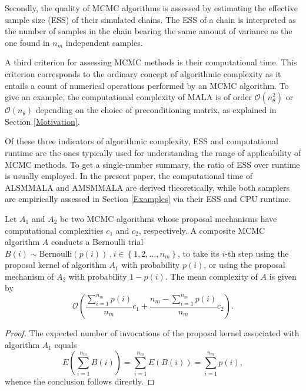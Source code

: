 \documentclass[twoside,11pt]{article}
\begin{document}
{Secondly, the quality of MCMC algorithms is assessed by estimating the effective sample size (ESS) of their simulated chains.
The ESS of a chain is interpreted as the number of samples in the chain bearing the same amount of variance as the one found 
in $n_m$ independent samples.

A third criterion for assessing MCMC methods is their computational time.
This criterion corresponds to the ordinary concept of algorithmic complexity as it entails a count of numerical operations
performed by an MCMC algorithm. To give an example, the computational complexity of MALA is of order
$\mathcal{O}(n_{\theta}^2)$ or $\mathcal{O}(n_{\theta})$ depending on the choice of preconditioning matrix, as explained in 
Section \ref{Motivation}.

Of these three indicators of algorithmic complexity, ESS and computational runtime are the ones typically used for
understanding the range of applicability of MCMC methods. To get a single-number summary, the ratio of ESS over runtime is
usually employed. In the present paper, the computational time of ALSMMALA and AMSMMALA are derived theoretically, while both
samplers are empirically assessed in Section \ref{Examples} via their ESS and CPU runtime.

\begin{proposition}
Let $A_1$ and $A_2$ be two MCMC algorithms whose proposal mechanisms have computational complexities $c_1$ and $c_2$, 
respectively. A composite MCMC algorithm $A$ conducts a Bernoulli trial
$B(i)\sim\mbox{Bernoulli}(p(i))~,i\in\left\{1,2,\dots,n_m\right\}$, to take its $i$-th step using the proposal kernel of 
algorithm $A_1$ with probability $p(i)$, or using the proposal mechanism of $A_2$ with probability $1-p(i)$. The mean 
complexity of $A$ is given by
\begin{equation}
\label{eq:c}
\mathcal{O}\left(
\dfrac{\sum_{i=1}^{n_m}p(i)}{n_m}c_1+\dfrac{n_m-\sum_{i=1}^{n_m}p(i)}{n_m}c_2
\right).
\end{equation}
\end{proposition}

\begin{proof}
The expected number of invocations of the proposal kernel associated with algorithm $A_1$ equals 
\begin{equation*}
E\left(\sum_{i=1}^{n_m}B(i)\right)=\sum_{i=1}^{n_m}E(B(i))=\sum_{i=1}^{n_m}p(i),
\end{equation*}
whence the conclusion follows directly.
\end{proof}

}
\end{document}
